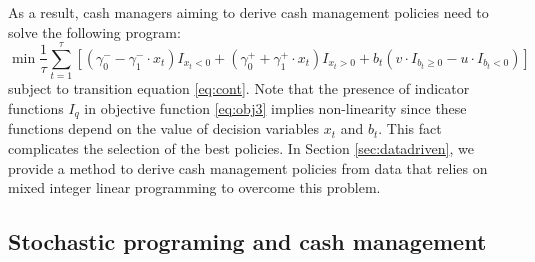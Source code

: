 As a result, cash managers aiming to derive cash management policies need to solve the following program:
\begin{equation}
\operatorname{min} \frac{1}{\tau} \sum_{t=1}^\tau{\left[ (\gamma_{0}^{-} - \gamma_{1}^{-} \cdot  x_t) I_{x_t < 0} + (\gamma_{0}^{+} + \gamma_{1}^{+} \cdot x_t) I_{x_t > 0} + b_t (v \cdot I_{b_t \geq 0} - u \cdot I_{b_t < 0}) \right]}
\label{eq:obj3}
\end{equation}
subject to transition equation \eqref{eq:cont}. Note that the presence of indicator functions $I_q$ in objective function \eqref{eq:obj3} implies non-linearity since these functions depend on the value of decision variables $x_t$ and $b_t$. This fact complicates the selection of the best policies. In Section \ref{sec:datadriven}, we provide a method to derive cash management policies from data that relies on mixed integer linear programming to overcome this problem. 


\subsection{Stochastic programing and cash management\label{sec:stochastic}}


